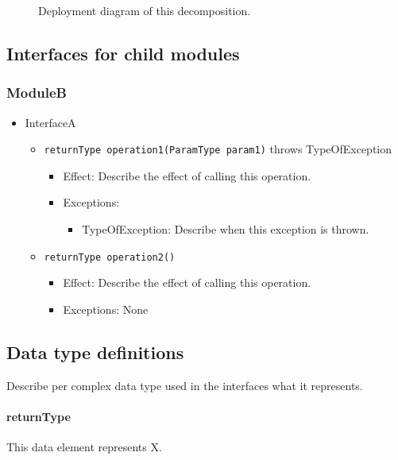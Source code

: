 \documentclass[english]{sareport}
\begin{document}
\begin{figure}[!htp]
	\centering
	\caption{Deployment diagram of this decomposition.
	}\label{fig:it1-depl_main}
\end{figure}

\subsection{Interfaces for child modules}
\subsubsection*{ModuleB}
\begin{itemize}
	\item InterfaceA
	\begin{itemize}
		\item \texttt{returnType operation1(ParamType param1)} throws TypeOfException
		\begin{itemize}
			\item Effect: Describe the effect of calling this operation.
			\item Exceptions:
			\begin{itemize}
				\item TypeOfException: Describe when this exception is thrown.
			\end{itemize}
		\end{itemize}

		\item \texttt{returnType operation2()}
		\begin{itemize}
			\item Effect: Describe the effect of calling this operation.
			\item Exceptions: None
		\end{itemize}
	\end{itemize}
\end{itemize}

\subsection{Data type definitions}
Describe per complex data type used in the interfaces what it represents.

\paragraph{returnType} This data element represents X.
\end{document}

